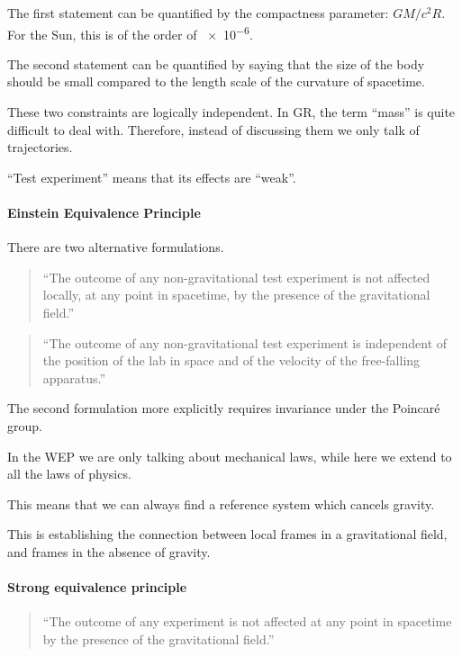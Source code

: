 \documentclass[main.tex]{subfiles}
\begin{document}
The first statement can be quantified by the compactness parameter: \(GM / c^2 R\). 
For the Sun, this is of the order of \num{e-6}. 

The second statement can be quantified by saying that the size of the body should be small compared to the length scale of the curvature of spacetime. 

These two constraints are logically independent.
In GR, the term ``mass'' is quite difficult to deal with. 
Therefore, instead of discussing them we only talk of trajectories. 

``Test experiment'' means that its effects are ``weak''. 

\paragraph{Einstein Equivalence Principle}

There are two alternative formulations.

\begin{quotation}
    ``The outcome of any non-gravitational test experiment is not affected locally, at any point in spacetime, by the presence of the gravitational field.''
\end{quotation}

\begin{quotation}
    ``The outcome of any non-gravitational test experiment is independent of the position of the lab in space and of the velocity of the free-falling apparatus.''
\end{quotation}

The second formulation more explicitly requires invariance under the Poincaré group. 

In the WEP we are only talking about mechanical laws, while here we extend to all the laws of physics. 

This means that we can always find a reference system which cancels gravity. 

This is establishing the connection between local frames in a gravitational field, and frames in the absence of gravity.


\paragraph{Strong equivalence principle}

\begin{quotation}
    ``The outcome of any experiment is not affected at any point in spacetime by the presence of the gravitational field.''
\end{quotation}
\end{document}
